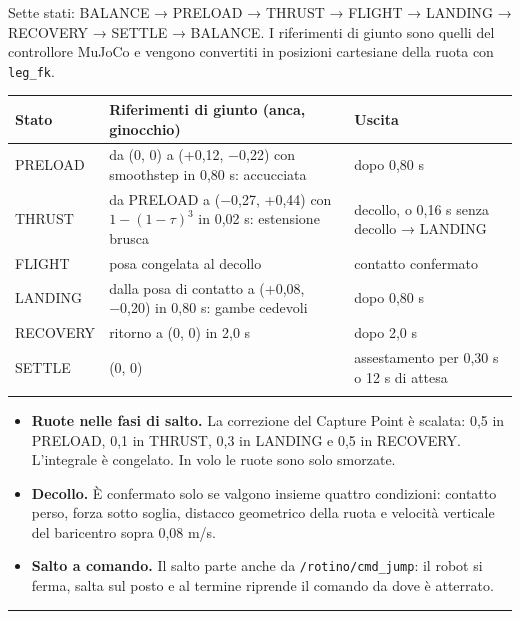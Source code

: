 \documentclass[
]{article}
\providecommand{\tightlist}{%
  \setlength{\itemsep}{0pt}\setlength{\parskip}{0pt}}
\begin{document}
Sette stati: BALANCE → PRELOAD → THRUST → FLIGHT → LANDING → RECOVERY → SETTLE → BALANCE. I riferimenti di giunto sono quelli del controllore MuJoCo e vengono convertiti in posizioni cartesiane della ruota con \texttt{leg\_fk}.

\begin{longtable}[]{@{}>{\raggedright\arraybackslash}p{}>{\raggedright\arraybackslash}p{}>{\raggedright\arraybackslash}p{}@{}}
\toprule\noalign{}
Stato & Riferimenti di giunto (anca, ginocchio) & Uscita \\
\midrule\noalign{}
\endhead
PRELOAD & da (0, 0) a (+0,12, −0,22) con smoothstep in 0,80 s: accucciata & dopo 0,80 s \\
THRUST & da PRELOAD a (−0,27, +0,44) con \(1-(1-\tau)^3\) in 0,02 s: estensione brusca & decollo, o 0,16 s senza decollo → LANDING \\
FLIGHT & posa congelata al decollo & contatto confermato \\
LANDING & dalla posa di contatto a (+0,08, −0,20) in 0,80 s: gambe cedevoli & dopo 0,80 s \\
RECOVERY & ritorno a (0, 0) in 2,0 s & dopo 2,0 s \\
SETTLE & (0, 0) & assestamento per 0,30 s o 12 s di attesa \\
\bottomrule\noalign{}
\end{longtable}

\begin{itemize}
\tightlist
\item \textbf{Ruote nelle fasi di salto.} La correzione del Capture Point è scalata: 0,5 in PRELOAD, 0,1 in THRUST, 0,3 in LANDING e 0,5 in RECOVERY. L'integrale è congelato. In volo le ruote sono solo smorzate.
\item \textbf{Decollo.} È confermato solo se valgono insieme quattro condizioni: contatto perso, forza sotto soglia, distacco geometrico della ruota e velocità verticale del baricentro sopra 0,08 m/s.
\item \textbf{Salto a comando.} Il salto parte anche da \texttt{/rotino/cmd\_jump}: il robot si ferma, salta sul posto e al termine riprende il comando da dove è atterrato.
\end{itemize}

\begin{center}\rule{0.5\linewidth}{0.5pt}\end{center}
\end{document}
